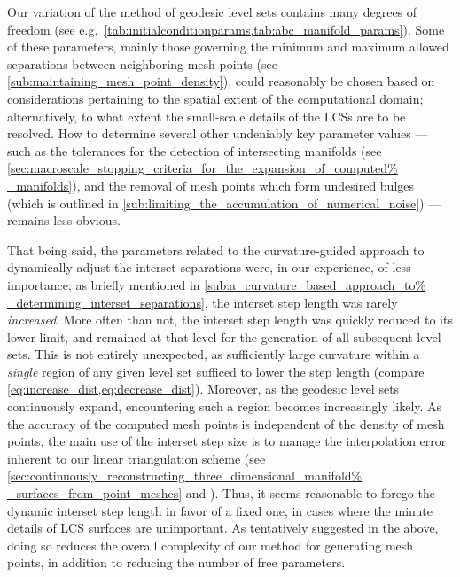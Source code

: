 Our variation of the method of geodesic level sets contains many
degrees of freedom (see e.g.\
\cref{tab:initialconditionparams,tab:abc_manifold_params}). Some of these
parameters, mainly those governing the minimum and maximum allowed separations
between neighboring mesh points (see
\cref{sub:maintaining_mesh_point_density}), could reasonably be chosen based on
considerations pertaining to the spatial extent of the computational domain;
alternatively, to what extent the small-scale details of the LCSs are to be
resolved. How to determine several other undeniably key parameter values ---
such as the tolerances  for the detection of intersecting manifolds (see
\cref{sec:macroscale_stopping_criteria_for_the_expansion_of_computed%
_manifolds}), and the removal of mesh points which form undesired bulges (which
is outlined in \cref{sub:limiting_the_accumulation_of_numerical_noise}) ---
remains less obvious.

That being said, the parameters related to the curvature-guided approach to
dynamically adjust the interset separations were, in our experience, of less
importance; as briefly mentioned in \cref{sub:a_curvature_based_approach_to%
_determining_interset_separations}, the interset step length was rarely
\emph{increased}. More often than not, the interset step length was quickly
reduced to its lower limit, and remained at that level for the generation of
all subsequent level sets. This is not entirely unexpected, as sufficiently
large curvature within a \emph{single} region of any given level set sufficed
to lower the step length (compare \cref{eq:increase_dist,eq:decrease_dist}).
Moreover, as the geodesic level sets continuously expand, encountering such a
region becomes increasingly likely. As the accuracy of the computed mesh points
is independent of the density of mesh points, the main use of the interset step
size is to manage the interpolation error inherent to our linear triangulation
scheme (see \cref{sec:continuously_reconstructing_three_dimensional_manifold%
_surfaces_from_point_meshes} and \textcite{krauskopf2003computing}). Thus, it
seems reasonable to forego the dynamic interset step length in favor of a
fixed one, in cases where the minute details of LCS surfaces are unimportant.
As tentatively suggested in the above, doing so reduces the overall complexity
of our method for generating mesh points, in addition to reducing the number
of free parameters.

